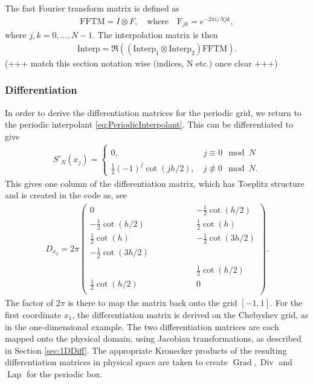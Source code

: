 \documentclass[11pt, a4paper]{article}
\theoremstyle{definition}
\DeclareMathOperator{\Grad}{Grad}
\DeclareMathOperator{\Div}{Div}
\DeclareMathOperator{\Lap}{Lap}
\begin{document}
The fast Fourier transform matrix is defined as
\begin{align*}
	\text{FFTM} = I \otimes F, \quad \text{where} \quad	\text{F}_{jk} =  e^{- 2 \pi i / N jk},
\end{align*}
where $j, k = 0,..., N -1$.
The interpolation matrix is then
\begin{align*}
	\text{Interp} = \Re\left(\left(\text{Interp}_{1} \otimes \text{Interp}_{2}\right) \text{FFTM}\right).
\end{align*}
(+++ match this section notation wise (indices, N etc.) once clear +++)

\subsubsection{Differentiation}
In order to derive the differentiation matrices for the periodic grid, we return to the periodic interpolant \eqref{eq:PeriodicInterpolant}. This can be differentiated to give 
\begin{align*}
	S'_N(x_j) =\left\{\begin{array}{l} 0, \phantom{(-1)^j \cot(j h /2)} \quad j \equiv 0  \mod N\\
	\frac{1}{2} (-1)^j \cot(j h /2), \quad j \not \equiv 0  \mod N.\end{array}\right.
\end{align*}
This gives one column of the differentiation matrix, which has Toeplitz structure and is created in the code as, see \cite{bibTrefethen}
\begin{align*}
	D_{x_2} = 2\pi
	\begin{pmatrix}
		0 & & &  & &  & &-\frac{1}{2} \cot(h /2) \\
		-\frac{1}{2} \cot(h /2)&  & & &  & &   &\frac{1}{2} \cot(h) \\
		\frac{1}{2} \cot(h)& &  & & &    & & -\frac{1}{2} \cot(3 h /2)\\
		-\frac{1}{2} \cot( 3 h /2) & & &   & &  & & \\
		&  & & &   & &  & \\
		& & & &  & & & \frac{1}{2} \cot(h /2)\\
		\frac{1}{2} \cot(h /2)& &  & &   &  & & 0\\
	\end{pmatrix}.
\end{align*}
The factor of $2\pi$ is there to map the matrix back onto the grid $[-1,1]$. 
For the first coordinate $x_1$, the differentiation matrix is derived on the Chebyshev grid, as in the one-dimensional example. The two differentiation matrices are each mapped onto the physical domain, using Jacobian transformations, as described in Section \ref{sec:1DDiff}. The appropriate Kronecker products of the resulting differentiation matrices in physical space are taken to create $\Grad, \Div$ and $\Lap$ for the periodic box. 
\end{document}
